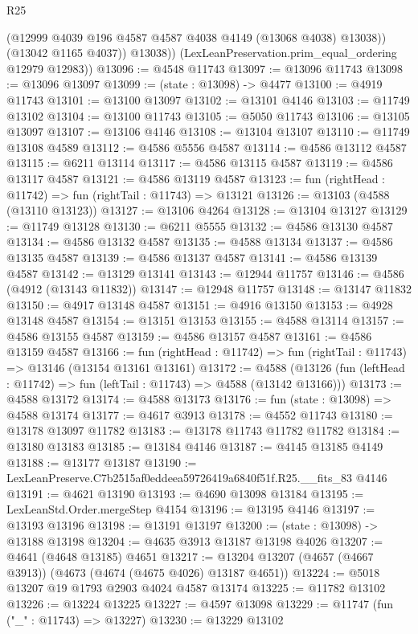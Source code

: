 \begin{lexlean}{R25}
\begin{coremodule}
              (@12999 @4039 @196 @4587 @4587 @4038 @4149 (@13068 @4038) @13038))
            (@13042 @1165 @4037))
          @13038))
      (LexLeanPreservation.prim_equal_ordering @12979 @12983))
@13096 := @4548 @11743
@13097 := @13096 @11743
@13098 := @13096 @13097
@13099 := (state : @13098) -> @4477
@13100 := @4919 @11743
@13101 := @13100 @13097
@13102 := @13101 @4146
@13103 := @11749 @13102
@13104 := @13100 @11743
@13105 := @5050 @11743
@13106 := @13105 @13097
@13107 := @13106 @4146
@13108 := @13104 @13107
@13110 := @11749 @13108 @4589
@13112 := @4586 @5556 @4587
@13114 := @4586 @13112 @4587
@13115 := @6211 @13114
@13117 := @4586 @13115 @4587
@13119 := @4586 @13117 @4587
@13121 := @4586 @13119 @4587
@13123 := fun (rightHead : @11742) => fun (rightTail : @11743) => @13121
@13126 := @13103 (@4588 (@13110 @13123))
@13127 := @13106 @4264
@13128 := @13104 @13127
@13129 := @11749 @13128
@13130 := @6211 @5555
@13132 := @4586 @13130 @4587
@13134 := @4586 @13132 @4587
@13135 := @4588 @13134
@13137 := @4586 @13135 @4587
@13139 := @4586 @13137 @4587
@13141 := @4586 @13139 @4587
@13142 := @13129 @13141
@13143 := @12944 @11757
@13146 := @4586 (@4912 (@13143 @11832))
@13147 := @12948 @11757
@13148 := @13147 @11832
@13150 := @4917 @13148 @4587
@13151 := @4916 @13150
@13153 := @4928 @13148 @4587
@13154 := @13151 @13153
@13155 := @4588 @13114
@13157 := @4586 @13155 @4587
@13159 := @4586 @13157 @4587
@13161 := @4586 @13159 @4587
@13166 := fun (rightHead : @11742) => fun (rightTail : @11743) => @13146 (@13154 @13161 @13161)
@13172 := @4588
    (@13126 (fun (leftHead : @11742) => fun (leftTail : @11743) => @4588 (@13142 @13166)))
@13173 := @4588 @13172
@13174 := @4588 @13173
@13176 := fun (state : @13098) => @4588 @13174
@13177 := @4617 @3913
@13178 := @4552 @11743
@13180 := @13178 @13097 @11782
@13183 := @13178 @11743 @11782 @11782
@13184 := @13180 @13183
@13185 := @13184 @4146
@13187 := @4145 @13185 @4149
@13188 := @13177 @13187
@13190 := LexLeanPreserve.C7b2515af0eddeea59726419a6840f51f.R25.__fits_83 @4146
@13191 := @4621 @13190
@13193 := @4690 @13098 @13184
@13195 := LexLeanStd.Order.mergeStep @4154
@13196 := @13195 @4146
@13197 := @13193 @13196
@13198 := @13191 @13197
@13200 := (state : @13098) -> @13188 @13198
@13204 := @4635 @3913 @13187 @13198 @4026
@13207 := @4641 (@4648 @13185) @4651
@13217 := @13204 @13207 (@4657 (@4667 @3913)) (@4673 (@4674 (@4675 @4026) @13187 @4651))
@13224 := @5018 @13207 @19 @1793 @2903 @4024 @4587 @13174
@13225 := @11782 @13102
@13226 := @13224 @13225
@13227 := @4597 @13098
@13229 := @11747 (fun ("_" : @11743) => @13227)
@13230 := @13229 @13102

\end{coremodule}
\end{lexlean}
